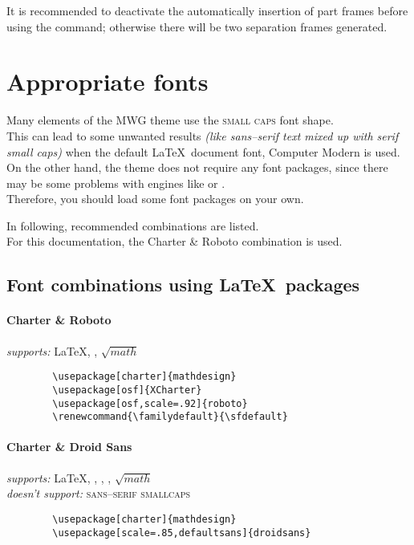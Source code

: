 \documentclass[11pt]{ltxdoc}
\begin{document}
	\bigskip
	It is recommended to deactivate the automatically insertion of part frames before using the \texttt{\appendix} command; otherwise there will be two separation frames generated.
	
	
	\section{Appropriate fonts}
	Many elements of the MWG theme use the \textsc{small caps} font shape. \\
	This can lead to some unwanted results \textit{(like sans--serif text mixed up with serif small caps)} when the default \LaTeX\ document font, Computer Modern is used. \\
	On the other hand, the theme does not require any font packages, since there may be some problems with engines like  or . \\
	Therefore, you should load some font packages on your own.
	
	\smallskip
	In following, recommended combinations are listed. \\
	For this documentation, the Charter \& \textsf{Roboto} combination is used.
	
	
	\subsection{Font combinations using \LaTeX\ packages}
	\raggedleft
	\paragraph*{Charter \& Roboto} \hfill
	\textit{supports:} \LaTeX, , $\sqrt{math}$ \nopagebreak\vspace{-.75em}
	\begin{verbatim}
		\usepackage[charter]{mathdesign}
		\usepackage[osf]{XCharter}
		\usepackage[osf,scale=.92]{roboto}
		\renewcommand{\familydefault}{\sfdefault}
	\end{verbatim}
	
	\paragraph*{Charter \& Droid Sans} \hfill
	\textit{supports:} \LaTeX, , , , $\sqrt{math}$ \\
	\textit{doesn't support:} \textsc{\textsf{sans--serif smallcaps}} \nopagebreak\vspace{-2em}
	\begin{verbatim}
		\usepackage[charter]{mathdesign}
		\usepackage[scale=.85,defaultsans]{droidsans}
	\end{verbatim}
	
\end{document}
